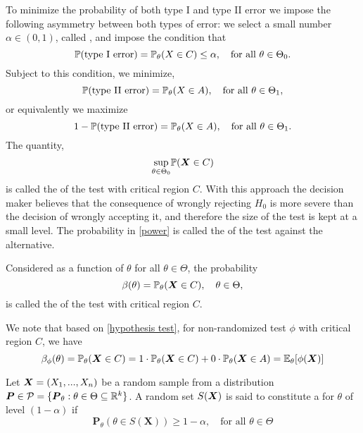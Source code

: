 To minimize the probability of both type I and type II error we impose the following asymmetry between both types of error: we select a small number $\alpha \in (0,1)$, called , and impose the condition that
$$
\mathbb P(\text{type I error}) = \mathbb P_{\theta}(X \in C) \leq \alpha,  \quad \text{for all } \theta \in \Theta_{0}.
$$
Subject to this condition, we minimize,
$$
\mathbb P(\text{type II error}) = \mathbb P_{\theta}(X \in A),  \quad \text{for all } \theta \in \Theta_{1},
$$
or equivalently we maximize
\begin{equation}\label{power}
    1- \mathbb P(\text{type II error}) = \mathbb P_{\theta}(X \in A),  \quad \text{for all } \theta \in \Theta_{1}.
\end{equation}
The quantity,
$$
\underset{\theta \in \Theta_{0}}{\text{sup}} \mathbb P(\boldsymbol{X} \in C)
$$
is called the  of the test with critical region $C$. With this approach the decision maker believes that the consequence of wrongly rejecting $H_0$ is more severe than the decision of wrongly accepting it, and therefore the size of the test is kept at a small level. The probability in \ref{power} is called the  of the test against the alternative. 
\begin{definition}
    Considered as a function of $\theta$ for all $\theta \in \Theta$, the probability
    $$
    \beta(\theta) = \mathbb P_{\theta}(\boldsymbol{X} \in C), \quad \theta \in \Theta,
    $$
    is called the  of the test with critical region $C$.
\end{definition}
We note that based on \ref{hypothesis test}, for non-randomized test $\phi$ with critical region $C$, we have
$$
\beta_{\phi}(\theta) = \mathbb P_{\theta}(\boldsymbol{X} \in C) =
1 \cdot \mathbb P_{\theta}(\boldsymbol{X} \in C) + 0\cdot \mathbb P_{\theta}(\boldsymbol{X} \in A)
= \mathbb E_{\theta}[\phi(\boldsymbol{X})]
$$
\begin{definition}
    Let $\boldsymbol{X} = (X_1,...,X_n)$ be a random sample from a distribution 
    $\boldsymbol{P} \in \mathcal P = \{ \boldsymbol{P}_{\theta}: \theta \in \Theta \subseteq \mathbb R^{k} \}$. A random set $S(\boldsymbol{X})$ is said to constitute a  for $\theta$ of level $(1-\alpha)$ if
    $$
    \boldsymbol{P}_{\theta}(\theta \in S(\boldsymbol{X})) \geq 1-\alpha, \quad \text{for all } \theta \in \Theta
    $$
\end{definition}
